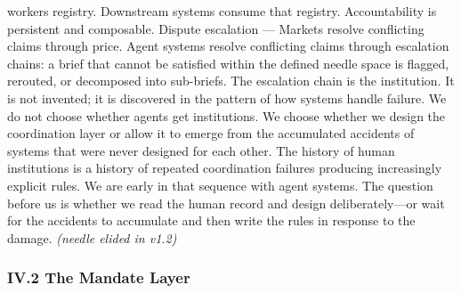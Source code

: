 \documentclass[
]{article}
\begin{document}
worker\textquotesingle s registry. Downstream systems consume that
registry. Accountability is persistent and composable. Dispute
escalation --- Markets resolve conflicting claims through price. Agent
systems resolve conflicting claims through escalation chains: a brief
that cannot be satisfied within the defined needle space is flagged,
rerouted, or decomposed into sub-briefs. The escalation chain is the
institution. It is not invented; it is discovered in the pattern of how
systems handle failure. We do not choose whether agents get
institutions. We choose whether we design the coordination layer or
allow it to emerge from the accumulated accidents of systems that were
never designed for each other. The history of human institutions is a
history of repeated coordination failures producing increasingly
explicit rules. We are early in that sequence with agent systems. The
question before us is whether we read the human record and design
deliberately---or wait for the accidents to accumulate and then write
the rules in response to the damage. \emph{(needle elided in v1.2)}

\subsubsection{IV.2 The Mandate Layer}\label{iv2-the-mandate-layer}
\end{document}
